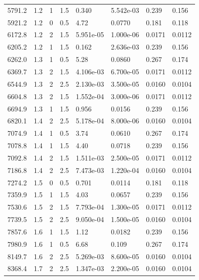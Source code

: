 \documentclass[preview]{standalone}
\begin{document}
{{{\begin{tabular}{L{1.2cm}C{1.2cm} C{0.3cm}C{0.5cm} C{1.4cm}C{1.4cm} C{1.4cm}C{1.4cm}}
  5791.2  &   1.2  & 1     & 1.5 &  0.340  & 5.542e-03  & 0.239 &  0.156   \\ 
  5921.2  &   1.2  & 0     & 0.5 &  4.72  & 0.0770  & 0.181 &  0.118   \\ 
  6172.8  &   1.2  & 2     & 1.5 &  5.951e-05  & 1.000e-06  & 0.0171 &  0.0112   \\ 
  6205.2  &   1.2  & 1     & 1.5 &  0.162  & 2.636e-03  & 0.239 &  0.156   \\ 
  6262.0  &   1.3  & 1     & 0.5 &  5.28  & 0.0860  & 0.267 &  0.174   \\ 
  6369.7  &   1.3  & 2     & 1.5 &  4.106e-03  & 6.700e-05  & 0.0171 &  0.0112   \\ 
  6544.9  &   1.3  & 2     & 2.5 &  2.130e-03  & 3.500e-05  & 0.0160 &  0.0104   \\ 
  6604.8  &   1.3  & 2     & 1.5 &  1.552e-04  & 3.000e-06  & 0.0171 &  0.0112   \\ 
  6694.9  &   1.3  & 1     & 1.5 &  0.956  & 0.0156  & 0.239 &  0.156   \\ 
  6820.1  &   1.4  & 2     & 2.5 &  5.178e-04  & 8.000e-06  & 0.0160 &  0.0104   \\ 
  7074.9  &   1.4  & 1     & 0.5 &  3.74  & 0.0610  & 0.267 &  0.174   \\ 
  7078.8  &   1.4  & 1     & 1.5 &  4.40  & 0.0718  & 0.239 &  0.156   \\ 
  7092.8  &   1.4  & 2     & 1.5 &  1.511e-03  & 2.500e-05  & 0.0171 &  0.0112   \\ 
  7186.8  &   1.4  & 2     & 2.5 &  7.473e-03  & 1.220e-04  & 0.0160 &  0.0104   \\ 
  7274.2  &   1.5  & 0     & 0.5 &  0.701  & 0.0114  & 0.181 &  0.118   \\ 
  7359.9  &   1.5  & 1     & 1.5 &  4.03  & 0.0657  & 0.239 &  0.156   \\ 
  7530.6  &   1.5  & 2     & 1.5 &  7.793e-04  & 1.300e-05  & 0.0171 &  0.0112   \\ 
  7739.5  &   1.5  & 2     & 2.5 &  9.050e-04  & 1.500e-05  & 0.0160 &  0.0104   \\ 
  7857.6  &   1.6  & 1     & 1.5 &  1.12  & 0.0182  & 0.239 &  0.156   \\ 
  7980.9  &   1.6  & 1     & 0.5 &  6.68  & 0.109  & 0.267 &  0.174   \\ 
  8149.7  &   1.6  & 2     & 2.5 &  5.269e-03  & 8.600e-05  & 0.0160 &  0.0104   \\ 
  8368.4  &   1.7  & 2     & 2.5 &  1.347e-03  & 2.200e-05  & 0.0160 &  0.0104   \\ 

\end{tabular}}}}
\end{document}
